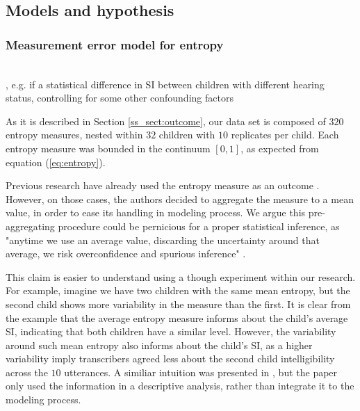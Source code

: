 \begin{comment}
	time needed for each judgement based on method from (Coertjens_et_al_2017).
	
	statistical efficiency has been researched on \citet{Leijon_et_al_2019} and \citet{Pritikin_2020} for the bayesian dichotomous BTL model and the ordinal BTL model, respectively.
\end{comment}
%
%
\subsection{Models and hypothesis} \label{s_sect:models}
%
\textcolor{blue}{}
%
%
\subsubsection{Measurement error model for entropy} \\
%
, e.g. if a statistical difference in SI between children with different hearing status, controlling for some other confounding factors

As it is described in Section \ref{ss_sect:outcome}, our data set is composed of $320$ entropy measures, nested within $32$ children with $10$ replicates per child. Each entropy measure was bounded in the continuum $[0,1]$, as expected from equation (\ref{eq:entropy}).

Previous research have already used the entropy measure as an outcome \citep{Boonen_et_al_2021, Faes_et_al_2021}. However, on those cases, the authors decided to aggregate the measure to a mean value, in order to ease its handling in modeling process. We argue this pre-aggregating procedure could be pernicious for a proper statistical inference, as "anytime we use an average value, discarding the uncertainty around that average, we risk overconfidence and spurious inference" \citep{McElreath_2020}. 

This claim is easier to understand using a though experiment within our research. For example, imagine we have two children with the same mean entropy, but the second child shows more variability in the measure than the first. It is clear from the example that the average entropy measure informs about the child's average SI, indicating that both children have a similar level. However, the variability around such mean entropy also informs about the child's SI, as a higher variability imply transcribers agreed less about the second child intelligibility across the $10$ utterances. A similiar intuition was presented in \citet{Boonen_et_al_2021}, but the paper only used the information in a descriptive analysis, rather than integrate it to the modeling process. 

